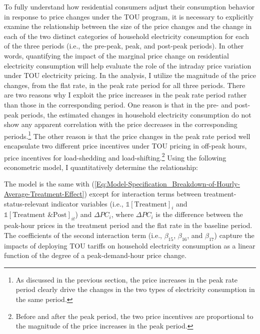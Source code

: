 To fully understand how residential consumers adjust their consumption behavior in response to price changes under the TOU program, it is necessary to explicitly examine the relationship between the size of the price changes and the change in each of the two distinct categories of household electricity consumption for each of the three periods (i.e., the pre-peak, peak, and post-peak periods). In other words, quantifying the impact of the marginal price change on residential electricity consumption will help evaluate the role of the intraday price variation under TOU electricity pricing. In the analysis, I utilize the magnitude of the price changes, from the flat rate, in the peak rate period for all three periods. There are two reasons why I exploit the price increases in the peak rate period rather than those in the corresponding period. One reason is that in the pre- and post-peak periods, the estimated changes in household electricity consumption do not show any apparent correlation with the price decreases in the corresponding periods.\footnote{As discussed in the previous section, the price increases in the peak rate period clearly drive the changes in the two types of electricity consumption in the same period.} The other reason is that the price changes in the peak rate period well encapsulate two different price incentives under TOU pricing in off-peak hours, price incentives for load-shedding and load-shifting.\footnote{Before and after the peak period, the two price incentives are proportional to the magnitude of the price increases in the peak period.} Using the following econometric model, I quantitatively determine the relationship:

The model is the same with (\ref{Eq:Model-Specification_Breakdown-of-Hourly-Average-Treatment-Effect}) except for interaction terms between treatment-status-relevant indicator variables (i.e., $\mathds{1}[\text{Treatment}]_{i}$ and $\mathds{1}[\text{Treatment \& Post}]_{it}$) and $\Delta PC_{i}$, where $\Delta PC_{i}$ is the difference between the peak-hour prices in the treatment period and the flat rate in the baseline period. The coefficients of the second interaction term (i.e., $\beta_{15}$, $\beta_{16}$, and $\beta_{17}$) capture the impacts of deploying TOU tariffs on household electricity consumption as a linear function of the degree of a peak-demand-hour price change. 

